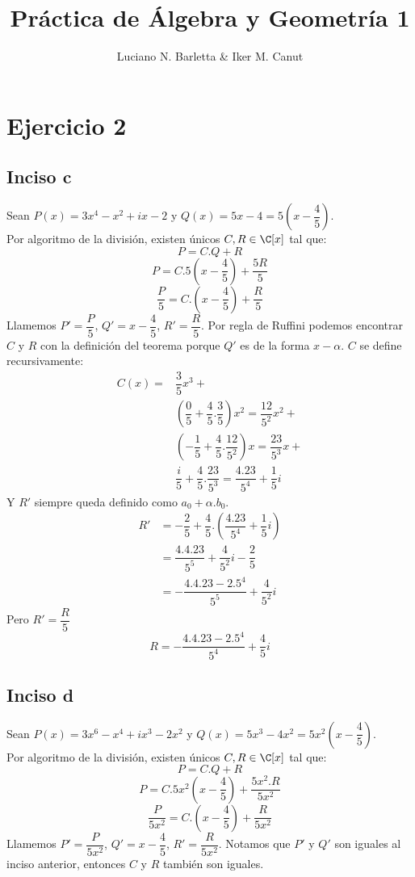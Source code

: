\documentclass[10pt]{article}
\author{Luciano N. Barletta \& Iker M. Canut}
\begin{document}
\title{Práctica de Álgebra y Geometría 1}
\maketitle
\date
\newpage

\tableofcontents
\newpage

\section{Ejercicio 2}

\subsection{Inciso c}
Sean $P(x) = 3x^4 - x^2 + ix - 2$ y $Q(x) = 5x - 4 = 5(x-\dfrac{4}{5})$.\\
Por algoritmo de la división, existen únicos $C, R \in \C[x]$ tal que:
$$P = C.Q + R$$
$$P = C.5(x-\dfrac{4}{5}) + \dfrac{5R}{5}$$
$$\dfrac{P}{5} = C.(x-\dfrac{4}{5}) + \dfrac{R}{5}$$
Llamemos $P' = \dfrac{P}{5}$, $Q' = x-\dfrac{4}{5}$, $R' = \dfrac{R}{5}$. Por regla de Ruffini podemos encontrar $C$ y $R$ con la definición del teorema porque $Q'$ es de la forma $x-\alpha$. $C$ se define recursivamente:
\begin{align}
	C(x) =& \dfrac{3}{5}x^3 + \\
	& (\dfrac{0}{5} + \dfrac{4}{5}.\dfrac{3}{5})x^2 = \dfrac{12}{5^2}x^2 + \\
	& (-\dfrac{1}{5} + \dfrac{4}{5}.\dfrac{12}{5^2})x = \dfrac{23}{5^3}x + \\
	& \dfrac{i}{5} + \dfrac{4}{5}.\dfrac{23}{5^3} = \dfrac{4.23}{5^4} + \dfrac{1}{5}i
\end{align}
Y $R'$ siempre queda definido como $a_0 + \alpha.b_0$.
\begin{align}
	R' &= -\dfrac{2}{5} + \dfrac{4}{5}.(\dfrac{4.23}{5^4} + \dfrac{1}{5}i)\\
	&= \dfrac{4.4.23}{5^5} + \dfrac{4}{5^2}i - \dfrac{2}{5}\\
	&= -\dfrac{4.4.23 - 2.5^4}{5^5} + \dfrac{4}{5^2}i
\end{align}
Pero $R' = \dfrac{R}{5}$
$$R = -\dfrac{4.4.23-2.5^4}{5^4} + \dfrac{4}{5}i$$

\subsection{Inciso d}
Sean $P(x) = 3x^6 - x^4 + ix^3 - 2x^2$ y $Q(x) = 5x^3 - 4x^2 = 5x^2(x-\dfrac{4}{5})$.\\
Por algoritmo de la división, existen únicos $C, R \in \C[x]$ tal que:
$$P = C.Q + R$$
$$P = C.5x^2(x-\dfrac{4}{5}) + \dfrac{5x^2.R}{5x^2}$$
$$\dfrac{P}{5x^2} = C.(x-\dfrac{4}{5}) + \dfrac{R}{5x^2}$$
Llamemos $P' = \dfrac{P}{5x^2}$, $Q' = x-\dfrac{4}{5}$, $R' = \dfrac{R}{5x^2}$. Notamos que $P'$ y $Q'$ son iguales al inciso anterior, entonces $C$ y $R$ también son iguales.
\end{document}
